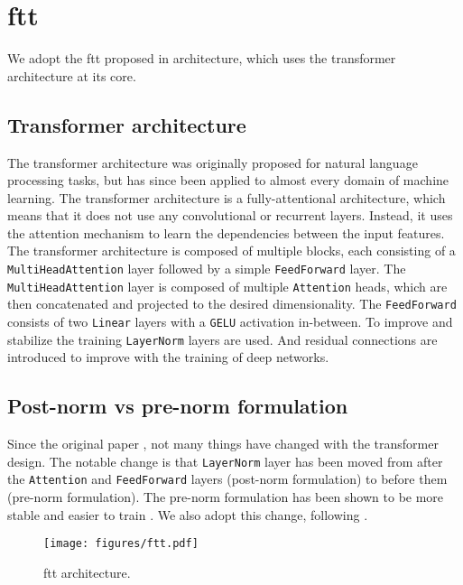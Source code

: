 \section[ft-transformer]{\gls{ftt}}

We adopt the \gls{ftt} proposed in \cite{ft-transformer} architecture, which uses the transformer \cite{transformer}
architecture at its core.

\subsection{Transformer architecture}

The transformer architecture was originally proposed for natural language processing tasks, but has since been applied
to almost every domain of machine learning. The transformer architecture is a fully-attentional architecture, which
means that it does not use any convolutional \cite{convolutional} or recurrent \cite{recurrent} layers. Instead, it uses
the attention mechanism to learn the dependencies between the input features. The transformer architecture is composed
of multiple blocks, each consisting of a \verb|MultiHeadAttention| layer followed by a simple \verb|FeedForward| layer.
The \verb|MultiHeadAttention| layer is composed of multiple \verb|Attention| heads, which are then concatenated and
projected to the desired dimensionality. The \verb|FeedForward| consists of two \verb|Linear| layers with a \verb|GELU|
activation in-between. To improve and stabilize the training \verb|LayerNorm| \cite{layernorm} layers are used. And
residual connections are introduced to improve with the training of deep networks.

\subsection{Post-norm vs pre-norm formulation}

Since the original paper \cite{transformer}, not many things have changed with the transformer design. The notable
change is that \verb|LayerNorm| layer has been moved from after the \verb|Attention| and \verb|FeedForward| layers
(post-norm formulation) to before them (pre-norm formulation). The pre-norm formulation has been shown to be more
stable and easier to train \cite{pre-norm}. We also adopt this change, following \cite{ft-transformer}.

\begin{figure}[htbp]
    \centering
    \texttt{[image: figures/ftt.pdf]}
    \caption{\gls{ftt} architecture.}
    \label{fig:ftt}
\end{figure}

